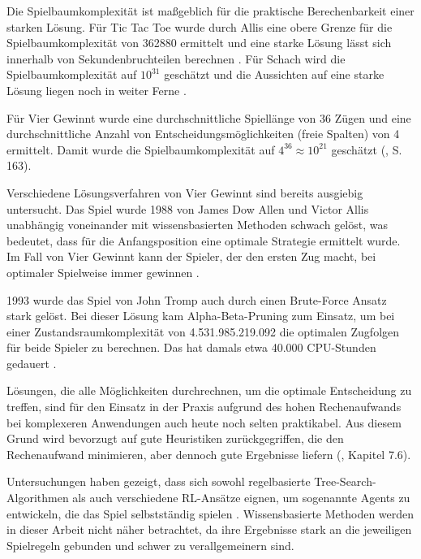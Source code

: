 Die Spielbaumkomplexität ist maßgeblich für die praktische Berechenbarkeit einer starken Lösung. Für Tic Tac Toe wurde durch Allis eine obere Grenze für die Spielbaumkomplexität von 362880 ermittelt und eine starke Lösung lässt sich innerhalb von Sekundenbruchteilen berechnen \cite{Paul.2009}. Für Schach wird die Spielbaumkomplexität auf $10^{31}$ geschätzt und die Aussichten auf eine starke Lösung liegen noch in weiter Ferne \cite{Schaeffer.2007}.

Für Vier Gewinnt wurde eine durchschnittliche Spiellänge von 36 Zügen und eine durchschnittliche Anzahl von Entscheidungsmöglichkeiten (freie Spalten) von 4 ermittelt. Damit wurde die Spielbaumkomplexität auf $4^{36} \approx 10^{21}$ geschätzt (\cite{Allis.1994}, S. 163).

Verschiedene Lösungsverfahren von Vier Gewinnt sind bereits ausgiebig untersucht. Das Spiel wurde 1988 von James Dow Allen und Victor Allis unabhängig voneinander mit wissensbasierten Methoden schwach gelöst, was bedeutet, dass für die Anfangsposition eine optimale Strategie ermittelt wurde. Im Fall von Vier Gewinnt kann der Spieler, der den ersten Zug macht, bei optimaler Spielweise immer gewinnen \cite{Allen.2010}\cite{Allis.1988}.

1993 wurde das Spiel von John Tromp auch durch einen Brute-Force Ansatz stark gelöst. Bei dieser Lösung kam Alpha-Beta-Pruning zum Einsatz, um bei einer Zustandsraumkomplexität von 4.531.985.219.092 die optimalen Zugfolgen für beide Spieler zu berechnen. Das hat damals etwa 40.000 CPU-Stunden gedauert \cite{Tromp}.

Lösungen, die alle Möglichkeiten durchrechnen, um die optimale Entscheidung zu treffen, sind für den Einsatz in der Praxis aufgrund des hohen Rechenaufwands bei komplexeren Anwendungen auch heute noch selten praktikabel. Aus diesem Grund wird bevorzugt auf gute Heuristiken zurückgegriffen, die den Rechenaufwand minimieren, aber dennoch gute Ergebnisse liefern (\cite{Heineman.October2008}, Kapitel 7.6).

Untersuchungen haben gezeigt, dass sich sowohl regelbasierte Tree-Search-Algorithmen als auch verschiedene RL-Ansätze eignen, um sogenannte Agents zu entwickeln, die das Spiel selbstständig spielen \cite{Alderton.2019}\cite{Thill.2012}\cite{Wäldchen.2022}\cite{Taylor.2024}\cite{Sheoran.2022}\cite{Qiu.2022}. Wissensbasierte Methoden werden in dieser Arbeit nicht näher betrachtet, da ihre Ergebnisse stark an die jeweiligen Spielregeln gebunden und schwer zu verallgemeinern sind.
